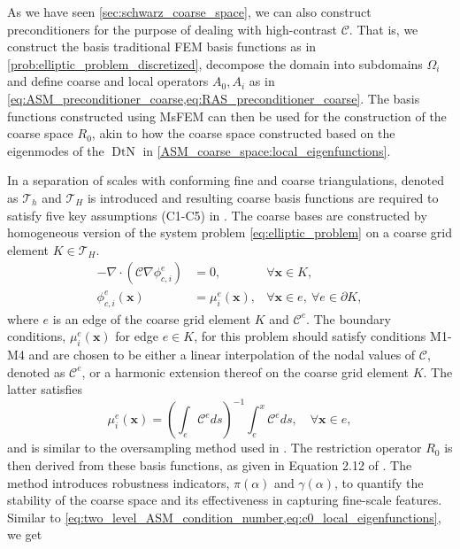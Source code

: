 As we have seen \cref{sec:schwarz_coarse_space}, we can also construct preconditioners for the purpose of dealing with high-contrast $\mathcal{C}$. That is, we construct the basis traditional FEM basis functions as in \cref{prob:elliptic_problem_discretized}, decompose the domain into subdomains $\Omega_i$ and define coarse and local operators $A_0, A_i$ as in \cref{eq:ASM_preconditioner_coarse,eq:RAS_preconditioner_coarse}. The basis functions constructed using MsFEM can then be used for the construction of the coarse space $R_0$, akin to how the coarse space constructed based on the eigenmodes of the $\operatorname{DtN}$ in \cref{ASM_coarse_space:local_eigenfunctions}.

In \cite{msfem_coarse_space_Graham_2007,msfem_for_darcy_Efendiev2011} a separation of scales with conforming fine and coarse triangulations, denoted as $\mathcal{T}_h$ and $\mathcal{T}_H$ is introduced and resulting coarse basis functions are required to satisfy five key assumptions (C1-C5) in \cite[Section 2.2]{msfem_coarse_space_Graham_2007}. The coarse bases are constructed by homogeneous version of the system problem \cref{eq:elliptic_problem} on a coarse grid element $K\in\mathcal{T}_H$.
\begin{equation}
    \begin{aligned}
        -\nabla\cdot(\mathcal{C} \nabla \phi^e_{c,i}) & = 0,                   & \forall \mathbf{x} \in K,                             \\
        \phi^e_{c,i}(\mathbf{x})                      & = \mu^e_i(\mathbf{x}), & \forall \mathbf{x} \in e, \ \forall e \in \partial K,
    \end{aligned}
    \label{eq:msfem_coarse_basis}
\end{equation}
where $e$ is an edge of the coarse grid element $K$ and $\mathcal{C}^e$. The boundary conditions, $\mu^e_i(\mathbf{x})$ for edge $e\in K$, for this problem should satisfy conditions M1-M4 \cite[Section 4]{msfem_coarse_space_Graham_2007} and are chosen to be either a linear interpolation of the nodal values of $\mathcal{C}$, denoted as $\mathcal{C}^e$, or a harmonic extension thereof on the coarse grid element $K$. The latter satisfies
\begin{equation}
    \mu^e_i(\mathbf{x}) = \left(\int_e \mathcal{C}^e ds\right)^{-1}\int_e^x \mathcal{C}^e ds, \quad \forall \mathbf{x} \in e,
    \label{eq:msfem_harmonic_extension}
\end{equation}
and is similar to the oversampling method used in \cite{og_msfem_Hou1997}. The restriction operator $R_0$ is then derived from these basis functions, as given in Equation 2.12 of \cite{msfem_coarse_space_Graham_2007}. The method introduces robustness indicators, $\pi(\alpha)$ and $\gamma(\alpha)$, to quantify the stability of the coarse space and its effectiveness in capturing fine-scale features. Similar to \cref{eq:two_level_ASM_condition_number,eq:c0_local_eigenfunctions}, we get \cite[Theorem 3.9]{msfem_coarse_space_Graham_2007}
